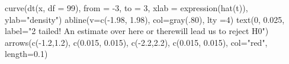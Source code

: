 \begin{Schunk}
\begin{Sinput}
 curve(dt(x, df = 99), from = -3, to = 3, xlab = expression(hat(t)), ylab="density")
 abline(v=c(-1.98, 1.98), col=gray(.80), lty =4)
 text(0, 0.025, label="2 tailed! \n An estimate over here or there\n will lead us to reject H0")
 arrows(c(-1.2,1.2), c(0.015, 0.015), c(-2.2,2.2), c(0.015, 0.015), col="red", length=0.1)
\end{Sinput}
\end{Schunk}
